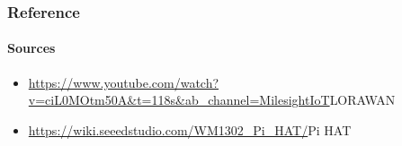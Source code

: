 \documentclass{beamer}
\begin{document}
\begin{frame}[t]
  \frametitle{Reference }
  \framesubtitle{Sources}
 \begin{itemize}
    \item \url{https://www.youtube.com/watch?v=ciL0MOtm50A&t=118s&ab_channel=MilesightIoT}{LORAWAN}
    \item \url{https://wiki.seeedstudio.com/WM1302_Pi_HAT/}{Pi HAT}
  \end{itemize}
\end{frame}
\end{document}
